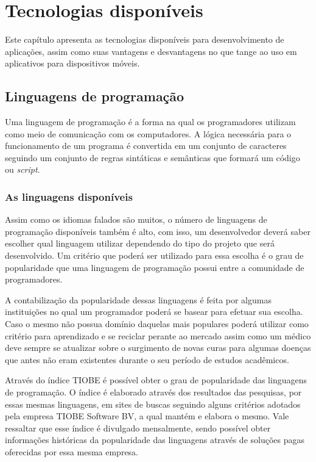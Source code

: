 \chapter{Tecnologias disponíveis} \label{Tecnologias disponíveis}

Este capítulo apresenta as tecnologias disponíveis para desenvolvimento de aplicações, assim como suas vantagens e desvantagens no que tange ao uso em aplicativos para dispositivos móveis.

\section{Linguagens de programação}

Uma linguagem de programação é a forma na qual os programadores utilizam como meio de comunicação com os computadores\cite{edirlei2015}. A lógica necessária para o funcionamento de um programa é convertida em um conjunto de caracteres seguindo um conjunto de regras sintáticas e semânticas que formará um código ou \textit{script}.\cite{fischerGrodzinsky1993}

\subsection{As linguagens disponíveis}

Assim como os idiomas falados são muitos, o número de linguagens de programação disponíveis também é alto, com isso, um desenvolvedor deverá saber escolher qual linguagem utilizar dependendo do tipo do projeto que será desenvolvido. Um critério que poderá ser utilizado para essa escolha é o grau de popularidade que uma linguagem de programação possui entre a comunidade de programadores.

A contabilização da popularidade dessas linguagens é feita por algumas instituições no qual um programador poderá se basear para efetuar sua escolha. Caso o mesmo não possua domínio daquelas mais populares poderá utilizar como critério para aprendizado e se reciclar perante ao mercado assim como um médico deve sempre se atualizar sobre o surgimento de novas curas para algumas doenças que antes não eram existentes durante o seu período de estudos acadêmicos.

Através do índice TIOBE\cite{tiobeDefinition} é possível obter o grau de popularidade das linguagens de programação. O índice é elaborado através dos resultados das pesquisas, por essas mesmas linguagens, em sites de buscas seguindo alguns critérios adotados pela empresa TIOBE Software BV\cite{tiobeAbout}, a qual mantém e elabora o mesmo. Vale ressaltar que esse índice é divulgado mensalmente, sendo possível obter informações históricas da popularidade das linguagens através de soluções pagas oferecidas por essa mesma empresa.

